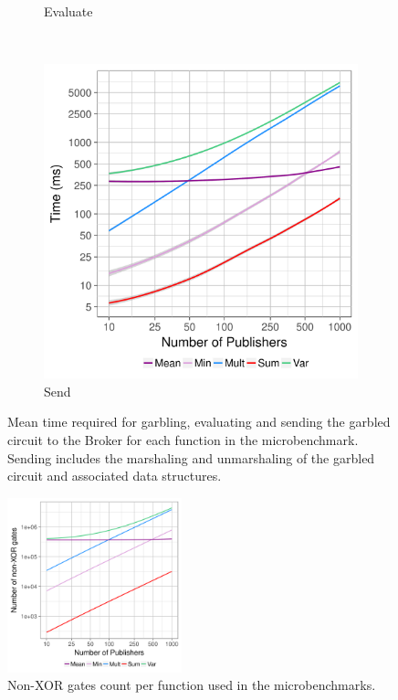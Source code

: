 \begin{figure}
\begin{subfigure}[b]{0.32\textwidth}
        \caption{Evaluate}
        \label{fig:micro-eval-time}
    \end{subfigure}
    ~ %
    \begin{subfigure}[b]{0.32\textwidth}
        \includegraphics[width=\textwidth]{plots/send_loglog.png}
        \caption{Send}
        \label{fig:micro-send-time}
    \end{subfigure}
    \caption{Mean time required for garbling, evaluating and sending the
    garbled circuit to the Broker for each function in the microbenchmark.
    Sending includes the marshaling and unmarshaling of the garbled circuit and
    associated data structures.}
    \label{fig:micro-times}
\end{figure}


\begin{figure}
  \includegraphics[width=0.45\textwidth]{plots/nonxor_gates_log.png}
  \caption{Non-XOR gates count per function used in the microbenchmarks.}
  \label{micro-nonxor}
\end{figure}

